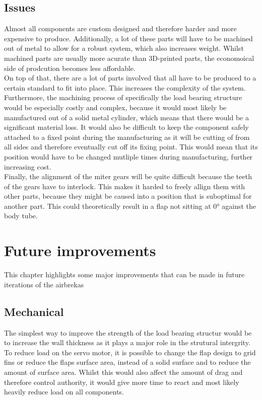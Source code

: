 \documentclass[fontsize=11pt,%
twoside,%
BCOR          = 8mm, %
DIV           = 11,  %
titlepage     = off,%
index=totoc,%
xcolor        = pdftex,%
dvipsnames,%
bibliography  = totoc,%
bibliography = numbered, %
listof        = notnumbered]{scrreprt}
\begin{document}
\subsection{Issues}
Almost all components are custom designed and therefore harder and more expensive to produce. Additionally, a lot of these parts will have to be machined out of metal to allow for a robust system, which also increases weight. Whilst machined parts are usually more acurate than 3D-printed parts, the economoical side of prodcution becomes less affordable.\\
On top of that, there are a lot of parts involved that all have to be produced to a certain standard to fit into place. This increases the complexity of the system.\\
Furthermore, the machining process of specifically the load bearing structure would be especially costly and complex, because it would most likely be manufactured out of a solid metal cylinder, which means that there would be a significant material loss. It would also be difficult to keep the component safely attached to a fixed point during the manufacturing as it will be cutting of from all sides and therefore eventually cut off its fixing point. This would mean that its position would have to be changed mutliple times during manufacturing, further increasing cost.\\
Finally, the alignment of the miter gears will be quite difficult because the teeth of the gears have to interlock. This makes it harded to freely allign them with other parts, because they might be caused into a position that is suboptimal for another part. This could theoretically result in a flap not sitting at 0° against the body tube.

\newpage

\section{Future improvements}
This chapter highlights some major improvements that can be made in future iterations of the airbrekas

\subsection{Mechanical}
The simplest way to improve the strength of the load bearing structur would be to increase the wall thickness as it plays a major role in the strutural intergrity.
To reduce load on the servo motor, it is possible to change the flap design to grid fins or reduce the flaps surface area, instead of a solid surface and to reduce the amount of surface area. Whilst this would also affect the amount of drag and therefore control authority, it would give more time to react and most likely heavily reduce load on all components.
\end{document}
